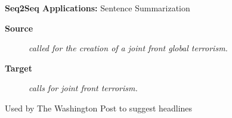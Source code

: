 \documentclass{beamer}
\let\tempone\itemize
\let\temptwo\enditemize
\renewenvironment{itemize}{\tempone\addtolength{\itemsep}{0.5\baselineskip}}{\temptwo}
\newcommand{\air}{\vspace{0.25cm}}
\newcommand{\mair}{\vspace{-0.25cm}}
\newcommand{\Cite}[1]{{\footnotesize \citep{#1}}}
\begin{document}
\begin{frame}
  \centerline{\textbf{Seq2Seq Applications:} \alert{Sentence Summarization} \Cite{Rush2015} }
  \begin{center}
    \textbf{Source}
  \end{center}
  
  \begin{figure}
    \textit{
      called  for the creation of
      a joint front  global terrorism. }
  \end{figure}

  \begin{center}
    \textbf{Target}
  \end{center}
  \mair

  \begin{figure}
    \centering
    \textit{ calls for joint
      front  terrorism.}
  \end{figure}

\air
\air



\pause
  \begin{itemize}
  \item Used by The Washington Post to suggest headlines \Cite{shuguangwang}
  \end{itemize}
\end{frame}
\end{document}
